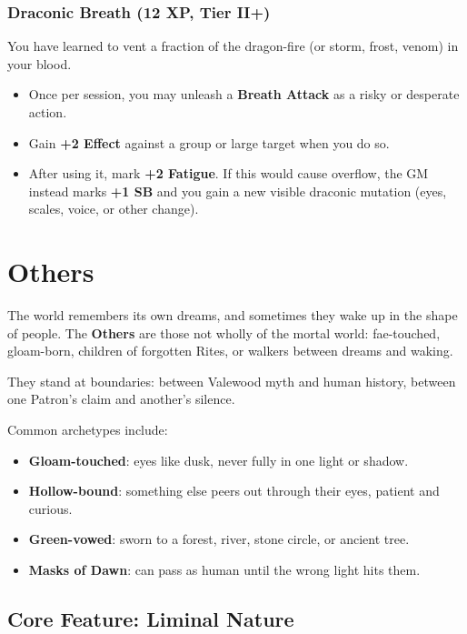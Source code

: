 \documentclass[11pt]{book}
\begin{document}
\subsubsection{Draconic Breath (12 XP, Tier II+)}
\label{talent:draconic_breath}

You have learned to vent a fraction of the dragon-fire (or storm, frost, venom) in your blood.

\begin{itemize}
  \item Once per session, you may unleash a \textbf{Breath Attack} as a risky or desperate action.
  \item Gain \textbf{+2 Effect} against a group or large target when you do so.
  \item After using it, mark \textbf{+2 Fatigue}. If this would cause overflow, the GM
        instead marks \textbf{+1 SB} and you gain a new visible draconic mutation
        (eyes, scales, voice, or other change).
\end{itemize}

\section{Others}
\label{sec:others}

The world remembers its own dreams, and sometimes they wake up in the shape of people. The \textbf{Others} are those not wholly of the mortal world:
fae-touched, gloam-born, children of forgotten Rites, or walkers between dreams and waking.

They stand at boundaries: between Valewood myth and human history, between one Patron's claim and another's silence.

Common archetypes include:
\begin{itemize}
  \item \textbf{Gloam-touched}: eyes like dusk, never fully in one light or shadow.
  \item \textbf{Hollow-bound}: something else peers out through their eyes, patient and curious.
  \item \textbf{Green-vowed}: sworn to a forest, river, stone circle, or ancient tree.
  \item \textbf{Masks of Dawn}: can pass as human until the wrong light hits them.
\end{itemize}

\subsection{Core Feature: Liminal Nature}
\label{subsec:liminal_nature}
\end{document}
